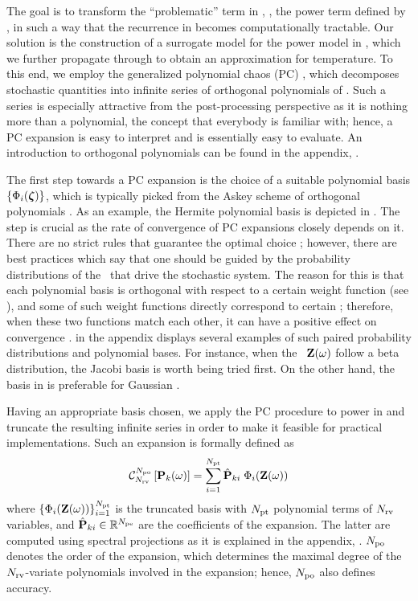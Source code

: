 The goal is to transform the ``problematic'' term in , \ie, the power term defined by , in such a way that the recurrence in  becomes computationally tractable. Our solution is the construction of a surrogate model for the power model in , which we further propagate through  to obtain an approximation for temperature. To this end, we employ the generalized polynomial chaos (PC) \cite{xiu2002}, which decomposes stochastic quantities into infinite series of orthogonal polynomials of \rvs. Such a series is especially attractive from the post-processing perspective as it is nothing more than a polynomial, the concept that everybody is familiar with; hence, a PC expansion is easy to interpret and is essentially easy to evaluate. An introduction to orthogonal polynomials can be found in the appendix, .

The first step towards a PC expansion is the choice of a suitable polynomial basis $\{ \Phi_i(\boldsymbol{\zeta}) \}$, which is typically picked from the Askey scheme of orthogonal polynomials \cite{xiu2002}. As an example, the Hermite polynomial basis is depicted in . The step is crucial as the rate of convergence of PC expansions closely depends on it. There are no strict rules that guarantee the optimal choice \cite{maitre2010, knio2006}; however, there are best practices which say that one should be guided by the probability distributions of the \rvs\ that drive the stochastic system. The reason for this is that each polynomial basis is orthogonal with respect to a certain weight function (see ), and some of such weight functions directly correspond to certain \pdfs; therefore, when these two functions match each other, it can have a positive effect on convergence \cite{xiu2002}.  in the appendix displays several examples of such paired probability distributions and polynomial bases. For instance, when the \rvs\ $\mathbf{Z}(\omega)$ follow a beta distribution, the Jacobi basis is worth being tried first. On the other hand, the basis in  is preferable for Gaussian \rvs.

Having an appropriate basis chosen, we apply the PC procedure to power in  and truncate the resulting infinite series in order to make it feasible for practical implementations. Such an expansion is formally defined as
\begin{equation} \elabel{pc-expansion}
  \oPC{\vars}{\pcorder}{\vP_k(\o)} = \sum_{i = 1}^{\pcterms} \pcc{\vP}_{ki} \; \pcb_i(\vZ(\o))
\end{equation}
where $\{ \Phi_i(\mathbf{Z}(\omega)) \}_{i = 1}^{{N_\text{pt}}}$ is the truncated basis with ${N_\text{pt}}$ polynomial terms of ${N_\text{rv}}$ variables, and $\hat{\mathbf{P}}_{ki} \in \mathbb{R}^{N_\text{pe}}$ are the coefficients of the expansion. The latter are computed using spectral projections as it is explained in the appendix, . ${N_\text{po}}$ denotes the order of the expansion, which determines the maximal degree of the ${N_\text{rv}}$-variate polynomials involved in the expansion; hence, ${N_\text{po}}$ also defines accuracy.

